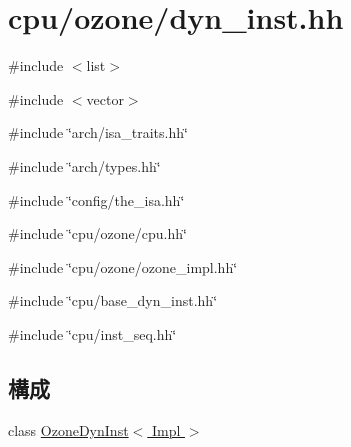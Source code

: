 \hypertarget{ozone_2dyn__inst_8hh}{
\section{cpu/ozone/dyn\_\-inst.hh}
\label{ozone_2dyn__inst_8hh}
}
{\ttfamily \#include $<$list$>$}\par
{\ttfamily \#include $<$vector$>$}\par
{\ttfamily \#include \char`\"{}arch/isa\_\-traits.hh\char`\"{}}\par
{\ttfamily \#include \char`\"{}arch/types.hh\char`\"{}}\par
{\ttfamily \#include \char`\"{}config/the\_\-isa.hh\char`\"{}}\par
{\ttfamily \#include \char`\"{}cpu/ozone/cpu.hh\char`\"{}}\par
{\ttfamily \#include \char`\"{}cpu/ozone/ozone\_\-impl.hh\char`\"{}}\par
{\ttfamily \#include \char`\"{}cpu/base\_\-dyn\_\-inst.hh\char`\"{}}\par
{\ttfamily \#include \char`\"{}cpu/inst\_\-seq.hh\char`\"{}}\par
\subsection*{構成}
\begin{DoxyCompactItemize}
\item 
class \hyperlink{classOzoneDynInst}{OzoneDynInst$<$ Impl $>$}
\end{DoxyCompactItemize}
